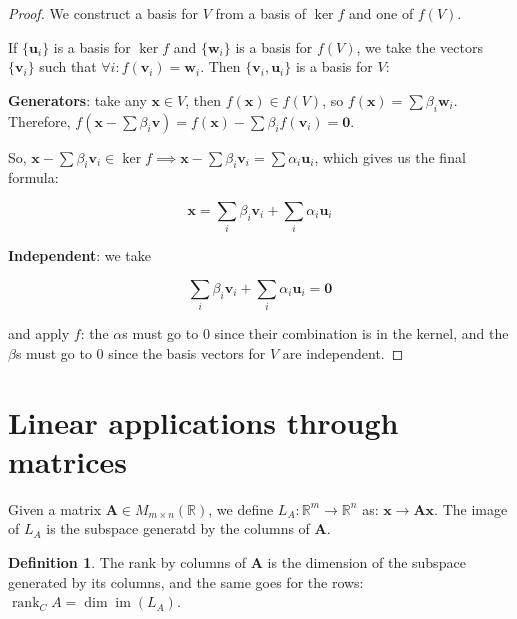 \documentclass[12pt,a4paper]{report}
\numberwithin{equation}{section}
\theoremstyle{definition}
\newtheorem{definition}{Definition}[section]
\theoremstyle{remark}
\DeclareMathOperator{\rank}{rank}
\DeclareMathOperator{\im}{im}
\begin{document}
\begin{proof}
We construct a basis for $V$ from a basis of $\ker f$ and one of $f(V)$.

If $\lbrace \mathbf{u}_i \rbrace$ is a basis for $\ker f$ and $\lbrace\mathbf{w}_i \rbrace $ is a basis for $f(V)$, we take the vectors $\lbrace \mathbf{v}_i \rbrace$ such that $\forall i: f(\mathbf{v}_i) = \mathbf{w}_i$. Then $\lbrace \mathbf{v}_i , \mathbf{u}_i \rbrace$ is a basis for $V$:


\textbf{Generators}: take any $\mathbf{x} \in V$, then $f(\mathbf{x}) \in f(V)$, so $f(\mathbf{x}) = \sum \beta_i \mathbf{w}_i$. Therefore, $f(\mathbf{x} - \sum \beta_i \mathbf{v} ) = f(\mathbf{x}) - \sum \beta_i f(\mathbf{v}_i) = \mathbf{0}$.

So, $\mathbf{x} - \sum \beta_i \mathbf{v}_i \in \ker f \implies \mathbf{x} - \sum \beta_i \mathbf{v}_i = \sum \alpha_i \mathbf{u}_i$, which gives us the final formula:

\begin{equation}
\mathbf{x} = \sum_i \beta_i \mathbf{v}_i + \sum_i \alpha_i \mathbf{u}_i
\end{equation}

\textbf{Independent}: we take

\begin{equation}
\sum_i \beta_i \mathbf{v}_i + \sum_i \alpha_i \mathbf{u}_i = \mathbf{0}
\end{equation}

and apply $f$: the $\alpha$s must go to 0 since their combination is in the kernel, and the $\beta$s must go to 0 since the basis vectors for $V$ are independent.
\end{proof}

\section{Linear applications through matrices}

Given a matrix $\mathbf{A} \in M_{m\times n} (\mathbb{R})$, we define $L_A: \mathbb{R}^m \rightarrow \mathbb{R}^n$ as: $\mathbf{x} \rightarrow \mathbf{Ax}$. The image of $L_A$ is the subspace generatd by the columns of $\mathbf{A}$.

\begin{definition}
The rank by columns of $\mathbf{A}$ is the dimension of the subspace generated by its columns, and the same goes for the rows: $\rank_C A = \dim \im(L_A)$.
\end{definition}
\end{document}
